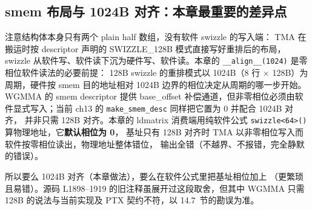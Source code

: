 \subsection{smem 布局与 1024B 对齐：本章最重要的差异点}





注意结构体本身只有两个 plain half 数组，没有软件 swizzle 的写入端：
TMA 在搬运时按 descriptor 声明的 SWIZZLE\_128B 模式直接写好重排后的布局，swizzle
从软件写、软件读下沉为硬件写、软件读。本章的
\texttt{\_\allowbreak{}\_\allowbreak{}align\_\allowbreak{}\_\allowbreak{}(1024)} 是零相位软件读法的必要前提：
128B swizzle 的重排模式以 1024B（8 行 $\times$ 128B）为周期，硬件按 smem
目的地址相对 1024B 边界的相位决定从周期的哪一步开始。WGMMA 的 smem descriptor
提供 base\_offset 补偿通道，但非零相位必须由软件显式写入；当前 ch13 的
\texttt{make\_\allowbreak{}smem\_\allowbreak{}desc} 同样把它置为 0 并配合 1024B 对齐，
并非只需 128B 对齐。本章的 ldmatrix 消费端用纯软件公式
\texttt{swizzle\allowbreak{}<64>\allowbreak{}()} 算物理地址，它\textbf{默认相位为 0}，
基址只有 128B 对齐时 TMA 以非零相位写入而软件按零相位读出，物理地址整体错位，
输出全错（不越界、不报错，完全静默的错误）。

所以要么 1024B 对齐（本章做法），要么在软件公式里把基址相位加上
（更繁琐且易错）。源码 L1898--1919 的旧注释虽展开过这段取舍，但其中
WGMMA 只需 128B 的说法与当前实现及 PTX 契约不符，以 14.7~节的勘误为准。

